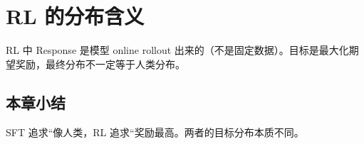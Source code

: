 \section{RL 的分布含义}
RL 中 Response 是模型 online rollout 出来的（不是固定数据）。目标是最大化期望奖励，最终分布不一定等于人类分布。

\subsection{本章小结}
SFT 追求``像人类，RL 追求``奖励最高。两者的目标分布本质不同。

\newpage
